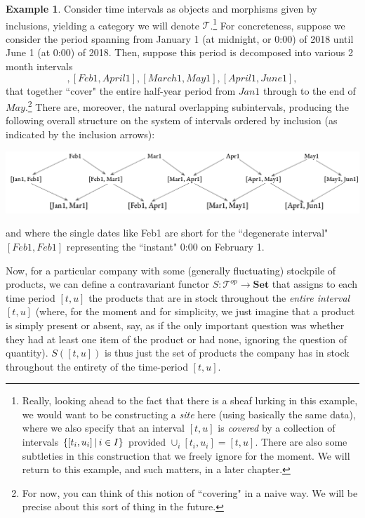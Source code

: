 \documentclass[11pt]{book}
\theoremstyle{definition}
\newtheorem{example}{Example}[section]
\theoremstyle{definition}
\theoremstyle{definition}
\theoremstyle{theorem}
\theoremstyle{definition}
\begin{document}
\begin{example}
	Consider time intervals as objects and morphisms given by inclusions, yielding a category we will denote $\mathcal{T}$.\footnote{Really, looking ahead to the fact that there is a sheaf lurking in this example, we would want to be constructing a \textit{site} here (using basically the same data), where we also specify that an interval $[t,u]$ is \textit{covered} by a collection of intervals $\{[t_i, u_i] \hspace*{0.2em}|\hspace*{0.2em} i \in I \}$ provided $\cup_i [t_i, u_i] = [t,u]$. There are also some subtleties in this construction that we freely ignore for the moment. We will return to this example, and such matters, in a later chapter.} For concreteness, suppose we consider the period spanning from January 1 (at midnight, or 0:00) of 2018 until June 1 (at 0:00) of 2018. Then, suppose this period is decomposed into various 2 month intervals 
	\begin{equation*} 
	[Jan1, March1], [Feb1, April1], [March1, May1], [April1, June1], 
	\end{equation*}
	that together ``cover" the entire half-year period from $Jan1$ through to the end of $May$.\footnote{For now, you can think of this notion of ``covering" in a naive way. We will be precise about this sort of thing in the future.} There are, moreover, the natural overlapping subintervals, producing the following overall structure on the system of intervals ordered by inclusion (as indicated by the inclusion arrows):  
	\begin{center}
		\includegraphics*[scale= 0.3]{TimeIntervalSite.png}
	\end{center}
and where the single dates like Feb1 are short for the ``degenerate interval" $[Feb1, Feb1]$ representing the ``instant" 0:00 on February 1. \par 
Now, for a particular company with some (generally fluctuating) stockpile of products, we can define a contravariant functor $S: \mathcal{T}^{op} \rightarrow \textbf{Set}$ that assigns to each time period $[t,u]$ the products that are in stock throughout the \textit{entire interval} $[t,u]$ (where, for the moment and for simplicity, we just imagine that a product is simply present or absent, say, as if the only important question was whether they had at least one item of the product or had none, ignoring the question of quantity). $S([t,u])$ is thus just the set of products the company has in stock throughout the entirety of the time-period $[t,u]$. \par 

\end{example}
\end{document}
